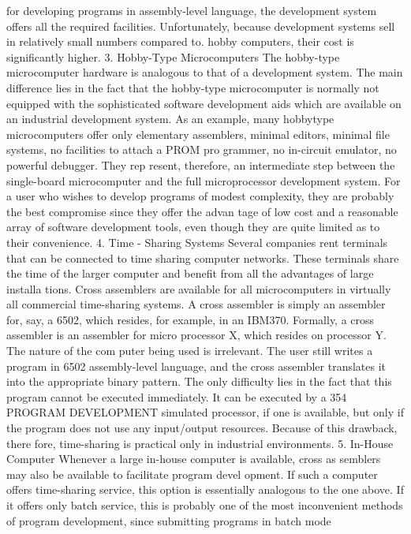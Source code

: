 {{{{{{{{{{{{{{{{{{{{{{{{{{{{{{{{{{{{{{{{{{{{{{{{{{{{{{{{{{{{{{{{{{{{{{{{{{{{{{{{{{{{{{{{{{{{{{{{{{{{{{{{{{{{{{{{{{{{{{{{{{{{{{{{{{{{{{{{{{{{for developing programs in assembly-level language, the development
system offers all the required facilities. Unfortunately, because
development systems sell in relatively small numbers compared to.
hobby computers, their cost is significantly higher.
3. Hobby-Type Microcomputers
The hobby-type microcomputer hardware is analogous to that of a
development system. The main difference lies in the fact that the
hobby-type microcomputer is normally not equipped with the
sophisticated software development aids which are available on
an industrial development system. As an example, many hobbytype
microcomputers offer only elementary assemblers, minimal
editors, minimal file systems, no facilities to attach a PROM pro
grammer, no in-circuit emulator, no powerful debugger. They rep
resent, therefore, an intermediate step between the single-board
microcomputer and the full microprocessor development system.
For a user who wishes to develop programs of modest complexity,
they are probably the best compromise since they offer the advan
tage of low cost and a reasonable array of software development
tools, even though they are quite limited as to their convenience.
4. Time - Sharing Systems
Several companies rent terminals that can be connected to time
sharing computer networks. These terminals share the time of the
larger computer and benefit from all the advantages of large installa
tions. Cross assemblers are available for all microcomputers in
virtually all commercial time-sharing systems. A cross assembler is
simply an assembler for, say, a 6502, which resides, for example, in
an IBM370. Formally, a cross assembler is an assembler for micro
processor X, which resides on processor Y. The nature of the com
puter being used is irrelevant. The user still writes a program in 6502
assembly-level language, and the cross assembler translates it into the
appropriate binary pattern. The only difficulty lies in the fact that this
program cannot be executed immediately. It can be executed by a
354
PROGRAM DEVELOPMENT
simulated processor, if one is available, but only if the program does
not use any input/output resources. Because of this drawback, there
fore, time-sharing is practical only in industrial environments.
5. In-House Computer
Whenever a large in-house computer is available, cross as
semblers may also be available to facilitate program devel
opment. If such a computer offers time-sharing service, this option
is essentially analogous to the one above. If it offers only batch
service, this is probably one of the most inconvenient methods of
program development, since submitting programs in batch mode
}}}}}}}}}}}}}}}}}}}}}}}}}}}}}}}}}}}}}}}}}}}}}}}}}}}}}}}}}}}}}}}}}}}}}}}}}}}}}}}}}}}}}}}}}}}}}}}}}}}}}}}}}}}}}}}}}}}}}}}}}}}}}}}}}}}}}}}}}}}}
